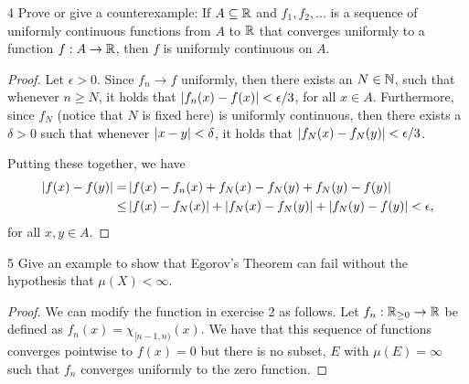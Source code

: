 \begin{exercise}{4}
Prove or give a counterexample:
If $A \subseteq \mathbb{R}$ and $f_1,f_2,\dots$ is a sequence of uniformly continuous functions from $A$ to $\mathbb{R}$ that converges uniformly to a function $f: A \to \mathbb{R}$, then $f$ is uniformly continuous on $A$.
\end{exercise}
\begin{proof}
Let $\epsilon > 0$.
Since $f_n \to f$ uniformly, then there exists an $N \in \mathbb{N}$, such that whenever $n \geq N$, it holds that $\left\lvert f_n(x) - f(x)\right\rvert < \epsilon/3$, for all $x \in A$.
Furthermore, since $f_N$ (notice that $N$ is fixed here) is uniformly continuous, then there exists a $\delta > 0$ such that whenever $\left\lvert x - y\right\rvert < \delta$, it holds that $\left\lvert f_N(x) - f_N(y)\right\rvert < \epsilon/3$.

Putting these together, we have
\begin{align*}
    \left\lvert f(x) - f(y)\right\rvert
    =& \left\lvert f(x) - f_n(x) + f_N(x) - f_N(y) + f_N(y) -f(y)\right\rvert\\
    \leq& \left\lvert f(x) - f_N(x)\right\rvert 
    + \left\lvert f_N(x) - f_N(y)\right\rvert
    + \left\lvert f_N(y) -f(y)\right\rvert < \epsilon,
\end{align*}
for all $x,y \in A$.
\end{proof} 

\begin{exercise}{5}
Give an example to show that Egorov's Theorem can fail without the hypothesis that $\mu(X) < \infty$.
\end{exercise}
\begin{proof}
We can modify the function in exercise 2 as follows.
Let $f_n : \mathbb{R}_{\geq 0} \to \mathbb{R}$ be defined as $f_n(x) = \chi_{[n-1,n)}(x)$.
We have that this sequence of functions converges pointwise to $f(x) = 0$ but there is no subset, $E$ with $\mu(E) = \infty$ such that $f_n$ converges uniformly to the zero function.
\end{proof} 

